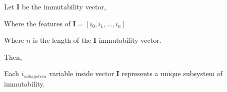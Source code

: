 \documentclass[english]{article}
\begin{document}
Let $\mathbf{I}$ be the immutability vector,

Where the features of $\mathbf{I}=\left[i_{0},i_{1},...,i_{n}\right]$

Where $\mathit{n}$ is the length of the $\mathbf{I}$ immutability
vector.

Then,

Each $i_{subsystem}$ variable inside vector $\mathbf{I}$ represents
a unique subsystem of immutability.
\end{document}
